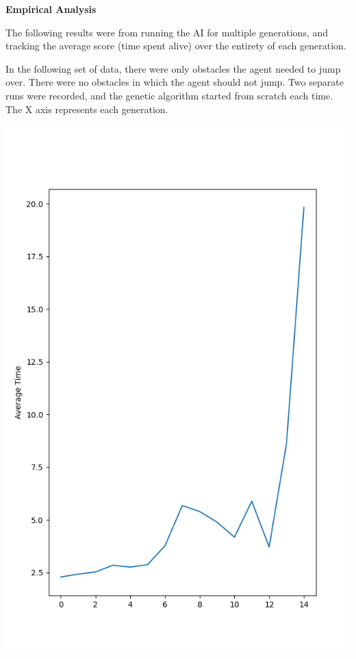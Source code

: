 \documentclass[12pt]{article}
\begin{document}
\begin{flushleft}
\hfill

\noindent\textbf{Empirical Analysis}

The following results were from running the AI for multiple generations, and tracking the average score (time spent alive) over the entirety of each generation.

In the following set of data, there were only obstacles the agent needed to jump over. There were no obstacles in which the agent should not jump. Two separate runs were recorded, and the genetic algorithm started from scratch each time. The X axis represents each generation. 

\includegraphics[scale=.4]{Figure_1.png}

\end{flushleft}
\end{document}
